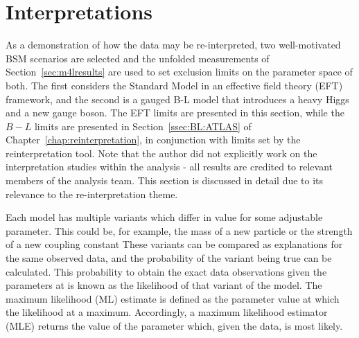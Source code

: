 \section{Interpretations}
\label{sec:interpretations}
As a demonstration of how the data may be re-interpreted, two well-motivated BSM scenarios are selected and the unfolded measurements of Section~\ref{sec:m4lresults} are used to set exclusion limits on the parameter space of both. The first considers the Standard Model in an effective field theory (EFT) framework, and the second is a gauged B-L model that introduces a heavy Higgs and a new gauge boson. The EFT limits are presented in this section, while the $B-L$ limits are presented in Section~\ref{ssec:BL:ATLAS} of Chapter~\ref{chap:reinterpretation}, in conjunction with limits set by the \contur reinterpretation tool. Note that the author did not explicitly work on the interpretation studies within the analysis - all results are credited to relevant members of the analysis team. This section is discussed in detail due to its relevance to the re-interpretation theme.

Each model has multiple variants which differ in value for some adjustable parameter. This could be, for example, the mass of a new particle or the strength of a new coupling constant These variants can be compared as explanations for the same observed data, and the probability of the variant being true can be calculated. This probability to obtain the exact data observations given the parameters at is known as the likelihood of that variant of the model. The maximum likelihood (ML) estimate is defined as the parameter value at which the likelihood at a maximum. Accordingly, a maximum likelihood estimator (MLE) returns the value of the parameter which, given the data, is most likely. 

